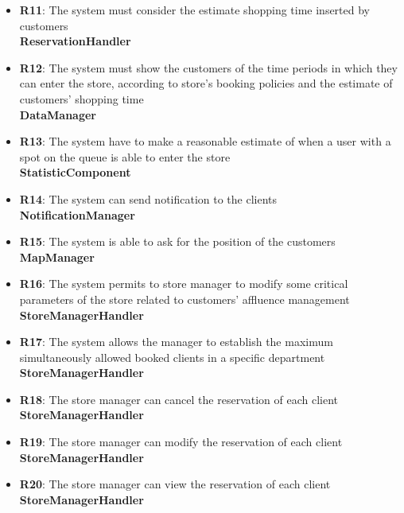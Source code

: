 \documentclass{article}
\begin{document}
\begin{itemize}
\item {\bfseries R11}: The system must consider the estimate shopping time inserted by customers \\
\textbf{ReservationHandler}

\item {\bfseries R12}: The system must show the customers of the time periods in which they can enter the store, according to store's booking policies and the estimate of customers' shopping time \\
\textbf{DataManager}

\item {\bfseries R13}: The system have to make a reasonable estimate of when a user with a spot on the queue is able to enter the store \\
\textbf{StatisticComponent}

\item {\bfseries R14}: The system can send notification to the clients \\
\textbf{NotificationManager}

\item {\bfseries R15}: The system is able to ask for the position of the customers \\
\textbf{MapManager}

\item {\bfseries R16}: The system permits to store manager to modify some critical parameters of the store related to customers' affluence management \\
\textbf{StoreManagerHandler}

\item {\bfseries R17}: The system allows the manager to establish the maximum simultaneously allowed booked clients in a specific department \\
\textbf{StoreManagerHandler}

\item {\bfseries R18}: The store manager can cancel the reservation of each client \\
\textbf{StoreManagerHandler}

\item {\bfseries R19}: The store manager can modify the reservation of each client \\
\textbf{StoreManagerHandler}

\item {\bfseries R20}: The store manager can view the reservation of each client \\
\textbf{StoreManagerHandler}


\end{itemize}
\end{document}
